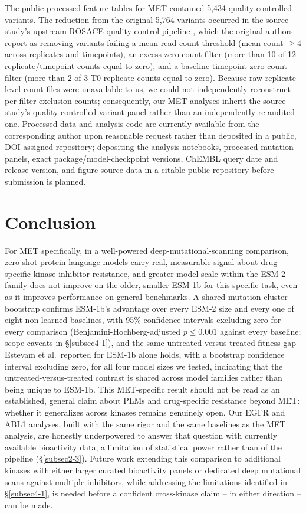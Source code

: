 \documentclass[pdflatex,sn-mathphys-num]{sn-jnl}%
\theoremstyle{thmstyleone}%
\theoremstyle{thmstyletwo}%
\theoremstyle{thmstylethree}%
\begin{document}
The public processed feature tables for MET contained 5{,}434 quality-controlled variants. The reduction from the original 5{,}764 variants occurred in the source study's upstream ROSACE quality-control pipeline \citep{Estevam2025}, which the original authors report as removing variants failing a mean-read-count threshold (mean count $\geq 4$ across replicates and timepoints), an excess-zero-count filter (more than 10 of 12 replicate/timepoint counts equal to zero), and a baseline-timepoint zero-count filter (more than 2 of 3 T0 replicate counts equal to zero). Because raw replicate-level count files were unavailable to us, we could not independently reconstruct per-filter exclusion counts; consequently, our MET analyses inherit the source study's quality-controlled variant panel rather than an independently re-audited one. Processed data and analysis code are currently available from the corresponding author upon reasonable request rather than deposited in a public, DOI-assigned repository; depositing the analysis notebooks, processed mutation panels, exact package/model-checkpoint versions, ChEMBL query date and release version, and figure source data in a citable public repository before submission is planned.

\section{Conclusion}\label{sec5}

For MET specifically, in a well-powered deep-mutational-scanning comparison, zero-shot protein language models carry real, measurable signal about drug-specific kinase-inhibitor resistance, and greater model scale within the ESM-2 family does not improve on the older, smaller ESM-1b for this specific task, even as it improves performance on general benchmarks. A shared-mutation cluster bootstrap confirms ESM-1b's advantage over every ESM-2 size and every one of eight non-learned baselines, with 95\% confidence intervals excluding zero for every comparison (Benjamini-Hochberg-adjusted $p \leq 0.001$ against every baseline; scope caveats in \S\ref{subsec4-1}), and the same untreated-versus-treated fitness gap Estevam et al.\ reported for ESM-1b alone holds, with a bootstrap confidence interval excluding zero, for all four model sizes we tested, indicating that the untreated-versus-treated contrast is shared across model families rather than being unique to ESM-1b. This MET-specific result should not be read as an established, general claim about PLMs and drug-specific resistance beyond MET: whether it generalizes across kinases remains genuinely open. Our EGFR and ABL1 analyses, built with the same rigor and the same baselines as the MET analysis, are honestly underpowered to answer that question with currently available bioactivity data, a limitation of statistical power rather than of the pipeline (\S\ref{subsec2-3}). Future work extending this comparison to additional kinases with either larger curated bioactivity panels or dedicated deep mutational scans against multiple inhibitors, while addressing the limitations identified in \S\ref{subsec4-1}, is needed before a confident cross-kinase claim -- in either direction -- can be made.
\end{document}

